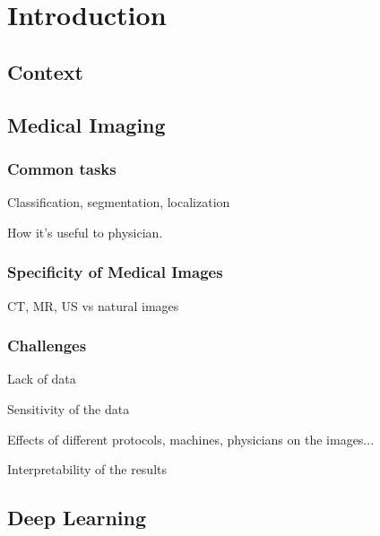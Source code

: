 \chapter{Introduction}
\label{chap:intro}

\minitoc

\newpage

\section{Context}

\section{Medical Imaging}

\subsection{Common tasks}

Classification, segmentation, localization

How it's useful to physician.

\subsection{Specificity of Medical Images}

CT, MR, US
vs
natural images

\subsection{Challenges}

Lack of data

Sensitivity of the data

Effects of different protocols, machines, physicians on the images...

Interpretability of the results

\section{Deep Learning}

